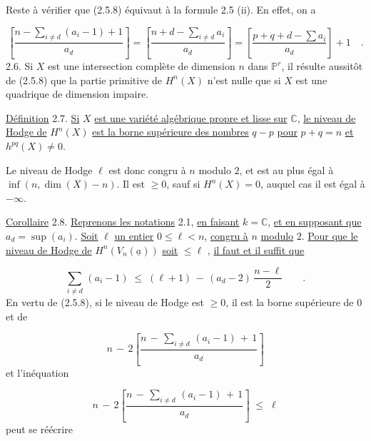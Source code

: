 Reste à vérifier que (2.5.8) équivaut à la formule 2.5 (ii). En effet, on a

\begin{equation*}
\left[ \displaystyle\frac{n - \sum\limits_{i \neq d} (a_i-1) + 1}{a_d} \right] = \left[ \displaystyle\frac{n + d - \sum\limits_{i \neq d} a_i}{a_d} \right] = \left[ \displaystyle\frac{p + q + d - \sum a_i}{a_d} \right] + 1 \quad .
\end{equation*}
2.6. \quad Si $X$ est une intersection complète de dimension $n$ dans $\mathbb{P}^r$, il résulte aussitôt de (2.5.8) que la partie primitive de $H^n(X)$ n'est nulle que si $X$ est une quadrique de dimension impaire.

\underline{Définition} 2.7. \underline{Si} $X$ \underline{est une variété algébrique propre et lisse sur} $\mathbb{C}$, \underline{le niveau de Hodge de} $H^n(X)$ \underline{est la borne supérieure des nombres} $q-p$ \underline{pour} $p+q = n$ \underline{et} $h^{pq}(X) \neq 0$.

Le niveau de Hodge $\ell$ est donc congru à $n$ modulo $2$, et est au plus égal à $\inf(n,\dim(X) - n)$. Il est $\geq 0$, sauf si $H^n(X) = 0$, auquel cas il est égal à $- \infty$.

\underline{Corollaire} 2.8. \underline{Reprenons les notations} 2.1, \underline{en faisant} $k = \mathbb{C}$, \underline{et en supposant que} $a_d = \sup (a_i)$. \underline{Soit} $\ell$ \underline{un entier} $0 \leq \ell < n$, \underline{congru à} $n$ \underline{modulo} $2$. \underline{Pour que le niveau de Hodge de} $H^n(V_n(\underline{a}))$ \underline{soit} $\leq \ell$ , \underline{il faut et il suffit que} 



\begin{equation*}
 \sum_{i \neq d} \, (a_i - 1) \;\leq\; (\ell + 1) \, - \, (a_d - 2) \, \frac{n - \ell}{2} \qquad .
\end{equation*}
En vertu de (2.5.8), si le niveau de Hodge est $\geq 0$, il est la borne supérieure de 0 et de

\begin{equation*}
n \, - \, 2 \left[ \frac{n \, - \, \sum_{i \neq d} \, (a_i - 1) \, + \, 1}{a_d} \right]
\end{equation*}
et l'inéquation

\begin{equation*}
n \, - \, 2 \left[ \frac{n \, - \, \sum_{i \neq d} \, (a_i - 1) \, + \, 1}{a_d} \right] \;\leq\; \ell
\end{equation*}
peut se réécrire

